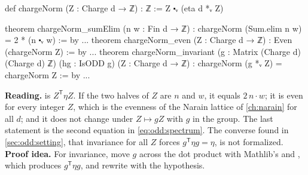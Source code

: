 \begin{leanbox}
\begin{leancode}
def chargeNorm (Z : Charge d → ℤ) : ℤ := Z ⬝ᵥ (eta d *ᵥ Z)

theorem chargeNorm_sumElim (n w : Fin d → ℤ) :
    chargeNorm (Sum.elim n w) = 2 * (n ⬝ᵥ w) := by ...
theorem chargeNorm_even (Z : Charge d → ℤ) : Even (chargeNorm Z) := by ...
theorem chargeNorm_invariant (g : Matrix (Charge d) (Charge d) ℤ)
    (hg : IsODD g) (Z : Charge d → ℤ) :
    chargeNorm (g *ᵥ Z) = chargeNorm Z := by ...
\end{leancode}
\textbf{Reading.}  is $Z^{\mathsf T}\eta Z$. If the two halves of $Z$
are $n$ and $w$, it equals $2\,n\cdot w$; it is even for every integer $Z$, which is the
evenness of the Narain lattice of \cref{ch:narain} for all $d$; and it does not change
under $Z\mapsto gZ$ with $g$ in the group. The last statement is the second equation in
\eqref{eq:odd:spectrum}. The converse found in \cref{sec:odd:setting}, that invariance for
all $Z$ forces $g^{\mathsf T}\eta g=\eta$, is not formalized.
\textbf{Proof idea.} For invariance, move $g$ across the dot product with Mathlib's
 and , which produces $g^{\mathsf T}\eta g$,
and rewrite with the hypothesis. \TA
\end{leanbox}

